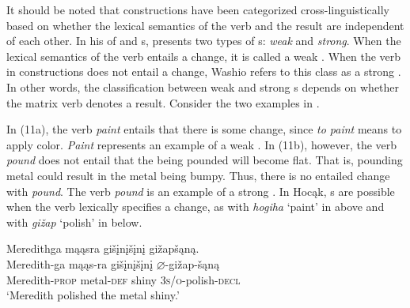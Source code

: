 \documentclass[output=paper]{LSP/langsci}
\begin{document}
It should be noted that  constructions have been categorized cross-linguistically based on whether the lexical semantics of the verb and the result are independent of each other. In his  of  and   s, \citet{Washio1997} presents two types of s: \textit{weak} and \textit{strong}. When the lexical semantics of the verb entails a change, it is called a weak . When the verb in  constructions does not entail a change, Washio refers to this class as a strong . In other words, the classification between weak and strong s depends on whether the matrix verb denotes a result. Consider the two  examples in .

\begin{exe}
\ex\label{ex:rosen:11}
\begin{xlist}



\end{xlist}
\end{exe}

In (11a), the verb \textit{paint} entails that there is some change, since \textit{to paint} means to apply color. \textit{Paint} represents an example of a weak . In (11b), however, the verb \textit{pound} does not entail that the  being pounded will become flat. That is, pounding metal could result in the metal being bumpy. Thus, there is no entailed change with \textit{pound}. The verb \textit{pound} is an example of a strong . In Hocąk, s are possible when the verb lexically specifies a change, as with \textit{hogiha} `paint' in  above and with \textit{gižap} `polish' in  below.

\begin{exe}
\ex\label{ex:rosen:12}
 \glll Meredithga mąąsra gišįnįšįnį gižapšąną.  \\
 Meredith-ga mąąs-ra gišįnįšįnį {$\varnothing$}-gižap-šąną\\
 Meredith-\textsc{prop} metal-\textsc{def} shiny \textsc{3s/o}-polish-\textsc{decl}\\
\glt `Meredith polished the metal shiny.'

\end{exe}
\end{document}
